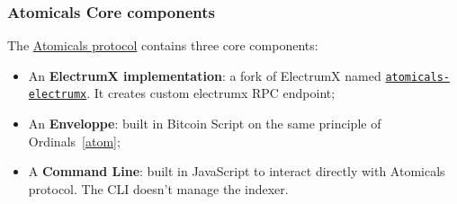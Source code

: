\documentclass[hyperref={colorlinks=true}]{beamer}
\begin{document}
\begin{frame}
\frametitle{Atomicals Core components}

\begin{center}
{\Large The \href{https://atomicals-community.github.io/atomicals-guide/}{Atomicals protocol} contains three core components}:\\
\vspace{0.3cm}

\begin{itemize}

\item An {\bf ElectrumX implementation}: a fork of ElectrumX named \href{https://github.com/atomicals/atomicals-electrumx}{\texttt{atomicals-electrumx}}. It creates custom electrumx RPC endpoint;\\

\item An {\bf Enveloppe}: built in Bitcoin Script on the same principle of Ordinals~\ref{atom};\\

\item A {\bf Command Line}: built in JavaScript to interact directly with Atomicals protocol. The CLI doesn't manage the indexer.\\

\end{itemize}

\end{center}

\end{frame}
\end{document}
